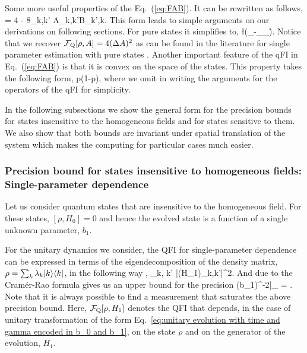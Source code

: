 Some more useful properties of the Eq.~(\ref{eq:FAB}).
It can be rewritten as follows,
\be
  \label{eq:QFI for two operators rewrited}
  \qfi[\rho, A, B] = 4 
  - 8\sum_{k,k'}
  {A}_{k,k'}{B}_{k',k}.
\ee
This form leads to simple arguments on our derivations on following sections.
For pure states it simplifies to,
\be
  \label{eq:QFI_pure}
  \l(_{\psi}-_{\psi}_{\psi}\r).
\ee
Notice that we recover $\mathcal{F}_{\text{Q}}[\rho,A]=4(\Delta A)^2$ as can be found in the literature for single parameter estimation with pure states \cite{Paris2009,Toth2013}.
Another important feature of the qFI in Eq.~(\ref{eq:FAB}) is that it is convex on the space of the states.
This property takes the following form,
\be
  \leq
  p\qfi[\rho_1]{+}(1{-}p)\qfi[\rho_2],
\ee
where we omit in writing the arguments for the operators of the qFI for simplicity.

In the following subsections we show the general form for the precision bounds for states insensitive to the homogeneous fields and for states sensitive to them. We also show that both bounds are invariant under spatial translation of the system which makes the computing for particular cases much easier.

\subsubsection{Precision bound  for states insensitive to homogeneous fields:
Single-parameter dependence}

Let us consider quantum states that are  insensitive to the homogeneous field.
For these states,  $[\rho, H_0]=0$ and hence the evolved state is a function of a single unknown parameter, $b_1$.

For the unitary dynamics we consider, the QFI for single-parameter dependence can be expressed in terms of the eigendecomposition of the density matrix,
$\rho=\sum_{k} \lambda_k \vert k \rangle\langle k \vert$, in the following way  \cite{Paris2009,Braunstein1994,Holevo1982,Helstrom1976,Petz2002,Petz2008},
\be
  \label{eq:general one parameter quantum fisher information}
  \sum_{k, k'}
  |({H_1})_{k,k'}|^2.
  \ee
  And due to the Cram\'er-Rao formula gives us an upper
  bound for the precision
  \be
  \label{eq:one parameter precision bound}
  (\Delta b_1)^{-2}|_{\max} = \qfi[\rho,H_1].
\ee
Note that it is always possible to find a measurement that saturates the above precision bound.
Here, $\mathcal{F}_{\text{Q}}[\rho,H_1]$ denotes the QFI that depends, in the case of unitary transformation of the form Eq.~\eqref{eq:unitary evolution with time and gamma encoded in b_0 and b_1}, on the state $\rho$ and on the generator of the evolution, $H_1$.

